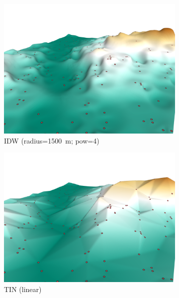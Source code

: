 \begin{figure}
\begin{subfigure}[b]{0.41\linewidth}
    \includegraphics{figs/results/idw_r1500_p4.png}
    \caption{IDW (radius=\SI{1500}{\m}; pow=4)}
  \end{subfigure}  
  \quad
  \begin{subfigure}[b]{0.41\linewidth}
    \centering
    \includegraphics{figs/results/tin.png}
    \caption{TIN (linear)}
  \end{subfigure}
  \quad
  \begin{subfigure}[b]{0.41\linewidth}
    \centering

\end{subfigure}
\end{figure}
